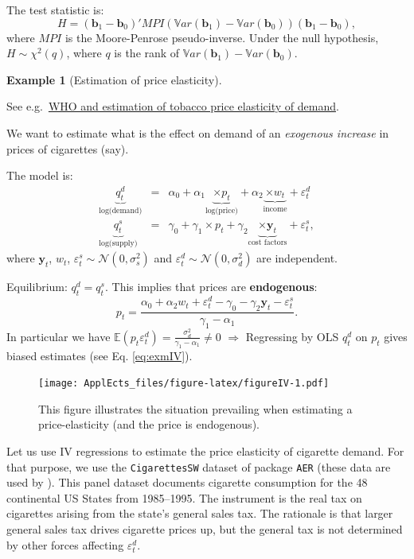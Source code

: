 \documentclass[
  12pt,
]{book}
\theoremstyle{definition}
\theoremstyle{definition}
\newtheorem{example}{Example}[chapter]
\theoremstyle{definition}
\theoremstyle{definition}
\theoremstyle{remark}
\begin{document}
The test statistic is:
\[
H = (\mathbf{b}_1 - \mathbf{b}_0)' MPI(\mathbb{V}ar(\mathbf{b}_1) - \mathbb{V}ar(\mathbf{b}_0))(\mathbf{b}_1 - \mathbf{b}_0),
\]
where \(MPI\) is the Moore-Penrose pseudo-inverse. Under the null hypothesis, \(H \sim \chi^2(q)\), where \(q\) is the rank of \(\mathbb{V}ar(\mathbf{b}_1) - \mathbb{V}ar(\mathbf{b}_0)\).

\begin{example}[Estimation of price elasticity]
\protect\hypertarget{exm:priceElasticity}{}\label{exm:priceElasticity}

See e.g.~\href{http://www.who.int/tobacco/economics/2_2estimatingpriceincomeelasticities.pdf?ua=1}{WHO and estimation of tobacco price elasticity of demand}.

We want to estimate what is the effect on demand of an \emph{exogenous increase} in prices of cigarettes (say).

The model is:
\begin{eqnarray*}
\underbrace{q^d_t}_{\mbox{log(demand)}} &=& \alpha_0 + \alpha_1 \underbrace{\times p_t}_{\mbox{log(price)}} + \alpha_2 \underbrace{\times w_t}_{\mbox{income}} + \varepsilon_t^d\\
\underbrace{q^s_t}_{\mbox{log(supply)}} &=& \gamma_0 + \gamma_1 \times p_t + \gamma_2 \underbrace{\times \mathbf{y}_t}_{\mbox{cost factors}} + \varepsilon_t^s,
\end{eqnarray*}
where \(\mathbf{y}_t\), \(w_t\), \(\varepsilon_t^s \sim \mathcal{N}(0,\sigma^2_s)\) and \(\varepsilon_t^d \sim \mathcal{N}(0,\sigma^2_d)\) are independent.

Equilibrium: \(q^d_t = q^s_t\). This implies that prices are \textbf{endogenous}:
\[
p_t = \frac{\alpha_0 + \alpha_2 w_t + \varepsilon_t^d - \gamma_0 - \gamma_2 \mathbf{y}_t - \varepsilon_t^s}{\gamma_1 - \alpha_1}.
\]
In particular we have \(\mathbb{E}(p_t \varepsilon_t^d) = \frac{\sigma^2_d}{\gamma_1 - \alpha_1} \ne 0\) \(\Rightarrow\) Regressing by OLS \(q_t^d\) on \(p_t\) gives biased estimates (see Eq. \eqref{eq:exmIV}).

\begin{figure}
\centering
\texttt{[image: ApplEcts\_files/figure-latex/figureIV-1.pdf]}
\caption{\label{fig:figureIV}This figure illustrates the situation prevailing when estimating a price-elasticity (and the price is endogenous).}
\end{figure}

Let us use IV regressions to estimate the price elasticity of cigarette demand. For that purpose, we use the \texttt{CigarettesSW} dataset of package \texttt{AER} (these data are used by \citet{Stock_Watson_2003}). This panel dataset documents cigarette consumption for the 48 continental US States from 1985--1995. The instrument is the real tax on cigarettes arising from the state's general sales tax. The rationale is that larger general sales tax drives cigarette prices up, but the general tax is not determined by other forces affecting \(\varepsilon_t^d\).


\end{example}
\end{document}
